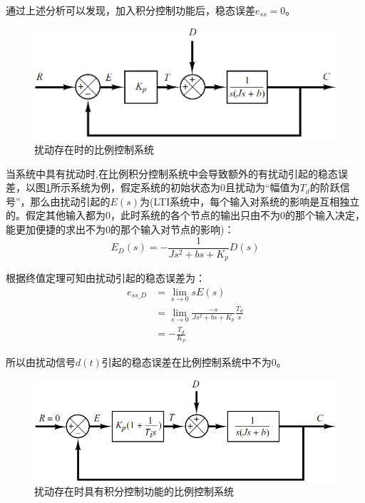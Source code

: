 \documentclass{article}
\numberwithin{equation}{section}
\numberwithin{figure}{section}
\begin{document}
通过上述分析可以发现，加入积分控制功能后，稳态误差$e_{ss}=0$。

\begin{figure}
    \centering
    \includegraphics[width=.6\textwidth]{Chapter5/DisturbanceProportionalControlSystem.png} %
    \caption{扰动存在时的比例控制系统} %
    \label{DisturbanceProportionalControlSystem} %
\end{figure}

当系统中具有扰动时,在比例积分控制系统中会导致额外的有扰动引起的稳态误差，以图\ref{DisturbanceProportionalControlSystem}所示系统为例，假定系统的初始状态为0且扰动为“幅值为$T_d$的阶跃信号”，那么由扰动引起的$E(s)$为(LTI系统中，每个输入对系统的影响是互相独立的。假定其他输入都为0，此时系统的各个节点的输出只由不为0的那个输入决定，能更加便捷的求出不为0的那个输入对节点的影响)：
\begin{equation}
    E_D(s)=-\frac{1}{Js^2+bs+K_p}D(s)
\end{equation}

根据终值定理可知由扰动引起的稳态误差为：
\begin{equation}
    \begin{split}
        e_{ss\_D}&=\lim_{s\rightarrow 0}sE(s)\\
        &=\lim_{s\rightarrow 0}\frac{-s}{Js^2+bs+K_p}\frac{T_d}{s}\\
        &=-\frac{T_d}{K_p}
    \end{split}
\end{equation}

所以由扰动信号$d(t)$引起的稳态误差在比例控制系统中不为0。

\begin{figure}
    \centering
    \includegraphics[width=.6\textwidth]{Chapter5/IntegralDisturbanceProportionalControlSystem.png} %
    \caption{扰动存在时具有积分控制功能的比例控制系统} %
    \label{IntegralDisturbanceProportionalControlSystem} %
\end{figure}
\end{document}
